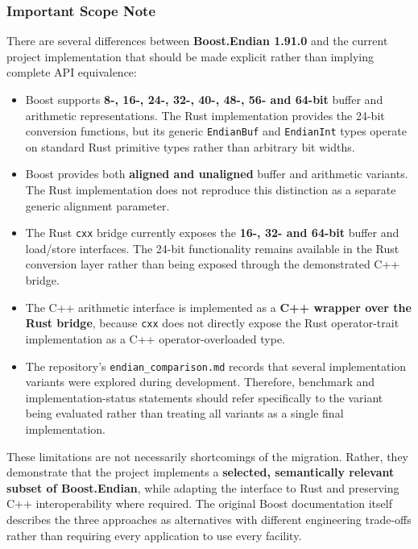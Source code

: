 \subsubsection{Important Scope Note}

There are several differences between \textbf{Boost.Endian 1.91.0} and the current project implementation that should be made explicit rather 
than implying complete API equivalence:

\begin{itemize}
\item Boost supports \textbf{8-, 16-, 24-, 32-, 40-, 48-, 56- and 64-bit} buffer and arithmetic representations. 
The Rust implementation provides the 24-bit conversion functions, but its generic \texttt{EndianBuf} and \texttt{EndianInt} types operate on 
standard Rust primitive types rather than arbitrary bit widths.

\item Boost provides both \textbf{aligned and unaligned} buffer and arithmetic variants. The Rust implementation does not reproduce this 
distinction as a separate generic alignment parameter.

\item The Rust \texttt{cxx} bridge currently exposes the \textbf{16-, 32- and 64-bit} buffer and load/store interfaces. 
The 24-bit functionality remains available in the Rust conversion layer rather than being exposed through the demonstrated C++ bridge.

\item The C++ arithmetic interface is implemented as a \textbf{C++ wrapper over the Rust bridge}, because \texttt{cxx} does not directly 
expose the Rust operator-trait implementation as a C++ operator-overloaded type.

\item The repository's \texttt{endian\_comparison.md} records that several implementation variants were explored during development. 
Therefore, benchmark and implementation-status statements should refer specifically to the variant being evaluated rather than treating all 
variants as a single final implementation.

\end{itemize}

These limitations are not necessarily shortcomings of the migration. Rather, they demonstrate that the project implements a 
\textbf{selected, semantically relevant subset of Boost.Endian}, while adapting the interface to Rust and preserving C++ interoperability 
where required. The original Boost documentation itself describes the three approaches as alternatives with different engineering trade-offs 
rather than requiring every application to use every facility.




